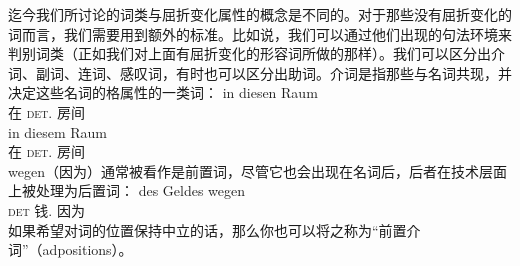 迄今我们所讨论的词类与屈折变化属性的概念是不同的。对于那些没有屈折变化的词而言，我们需要用到额外的标准。比如说，我们可以通过他们出现的句法环境来判别词类（正如我们对上面有屈折变化的形容词所做的那样）。我们可以区分出介词、副词、连词、感叹词，有时也可以区分出助词。介词是指那些与名词共现，并决定这些名词的格属性的一类词：
\eal
\ex 
\gll in diesen Raum\\
	 在 \textsc{det}.\acc{} 房间\\
\ex 
\gll in diesem Raum\\
	 在 \textsc{det}.\dat{} 房间\\
\zl
wegen（因为）通常被看作是前置词，尽管它也会出现在名词后，后者在技术层面上被处理为后置词：
\ea
\gll des Geldes wegen\\
	 \textsc{det} 钱.\gen{} 因为\\
\z
如果希望对词的位置保持中立的话，那么你也可以将之称为“前置介词”（adpositions）。

